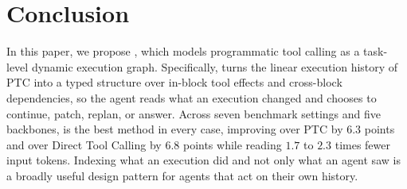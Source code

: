 \section{Conclusion}

In this paper, we propose \method, which models programmatic tool calling as a task-level dynamic execution graph.
Specifically, \method turns the linear execution history of PTC into a typed structure over in-block tool effects and cross-block dependencies, so the agent reads what an execution changed and chooses to continue, patch, replan, or answer.
Across seven benchmark settings and five backbones, \method is the best method in every case, improving over PTC by $6.3$ points and over Direct Tool Calling by $6.8$ points while reading $1.7$ to $2.3$ times fewer input tokens.
Indexing what an execution did and not only what an agent saw is a broadly useful design pattern for agents that act on their own history.
